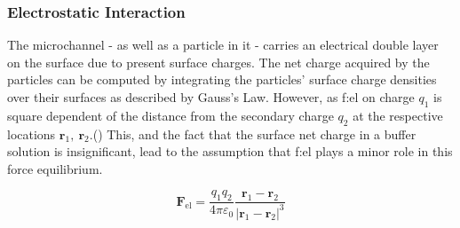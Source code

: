 \subsubsection{Electrostatic Interaction}
The microchannel - as well as a particle in it - carries an electrical double layer on the surface due to present surface charges. The net charge acquired by the particles can be computed by integrating the particles’ surface charge densities over their surfaces as described by Gauss’s Law. However, as \gls{f:el} on charge $q_1$ is square dependent of the distance from the secondary charge $q_2$ at the respective locations $\mathbf{r}_{1},\ \mathbf{r}_{2}$.() This, and the fact that the surface net charge in a buffer solution is insignificant, lead to the assumption that \gls{f:el} plays a minor role in this force equilibrium. 

\begin{equation}
	\mathbf{F}_\text{el}=\frac{q_{1} q_{2}}{4 \pi \varepsilon_{0}} \frac{\mathbf{r}_{1}-\mathbf{r}_{2}}{\left|\mathbf{r}_{1}-\mathbf{r}_{2}\right|^{3}} \label{eq:f:el}
\end{equation}

